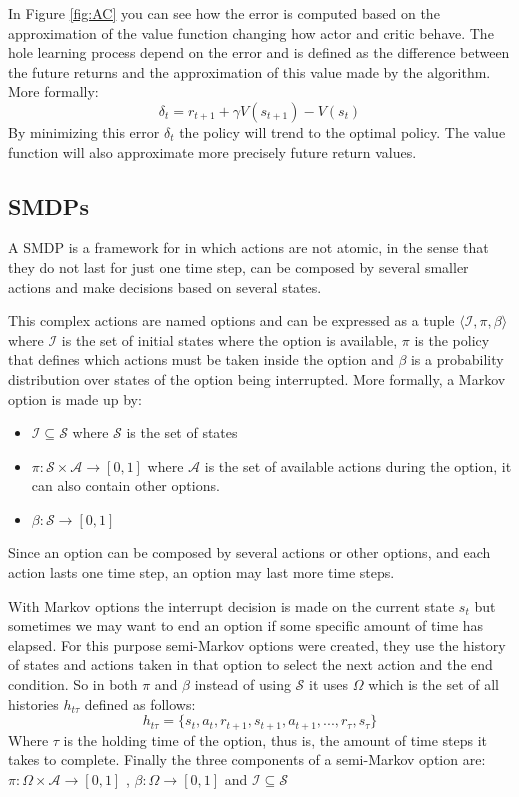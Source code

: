 In Figure \ref{fig:AC} you can see how the error is computed based on the approximation of the value function
changing how actor and critic behave.
The hole learning process depend on the error and is defined as the difference between the future returns and
the approximation of this value made by the algorithm.
More formally:
\begin{equation}
    \delta_t=r_{t+1}+\gamma V(s_{t+1})-V(s_t)
\end{equation}
By minimizing this error $\delta_t$ the policy will trend to the optimal policy.
The value function will also approximate more precisely future return values.


\subsection{\aclp{SMDP}}

A \ac{SMDP} is a framework for  in which actions are not atomic, in the sense that they
do not last for just one time step, can be composed by several smaller actions and make decisions based on several states.

This complex actions are named options and can be expressed as a tuple $\langle \mathcal{I}, \pi, \beta \rangle$ where
$\mathcal{I}$ is the set of initial states
where the option is available, $\pi$ is the policy that defines which actions must be taken inside the option and $\beta$ is a
probability distribution over states of the option being interrupted.
More formally, a Markov option is made up by:
\begin{itemize}
    \item $\mathcal{I} \subseteq \mathcal{S}$ where $\mathcal{S}$ is the set of states
    \item $\pi : \mathcal{S} \times \mathcal{A} \rightarrow [0,1]$ where $\mathcal{A}$ is the set of available actions
    during the option, it can also contain other options.
    \item $\beta : \mathcal{S} \rightarrow [0,1]$
\end{itemize}
Since an option can be composed by several actions or other options, and each action lasts one time step, an
option may last more time steps.

With Markov options the interrupt decision is made on the current state $s_t$ but sometimes we may want to end an option if
some specific amount of time has elapsed.
For this purpose semi-Markov options were created, they use the history of
states and actions taken in that option to select the next action and the end condition.
So in both $\pi$ and $\beta$ instead of
using $\mathcal{S}$ it uses $\Omega$ which is the set of all histories $h_{t\tau}$ defined as follows:
\begin{equation}
    h_{t\tau} = \{s_t,a_t,r_{t+1},s_{t+1},a_{t+1}, ... , r_\tau, s_\tau\}
\end{equation}
Where $\tau$ is the holding time of the option, thus is, the amount of time steps it takes to complete.
Finally the three components of a semi-Markov option are:
$\pi : \Omega \times \mathcal{A} \rightarrow [0,1]$ , $ \beta : \Omega \rightarrow [0,1]$ and
$\mathcal{I} \subseteq \mathcal{S}$

